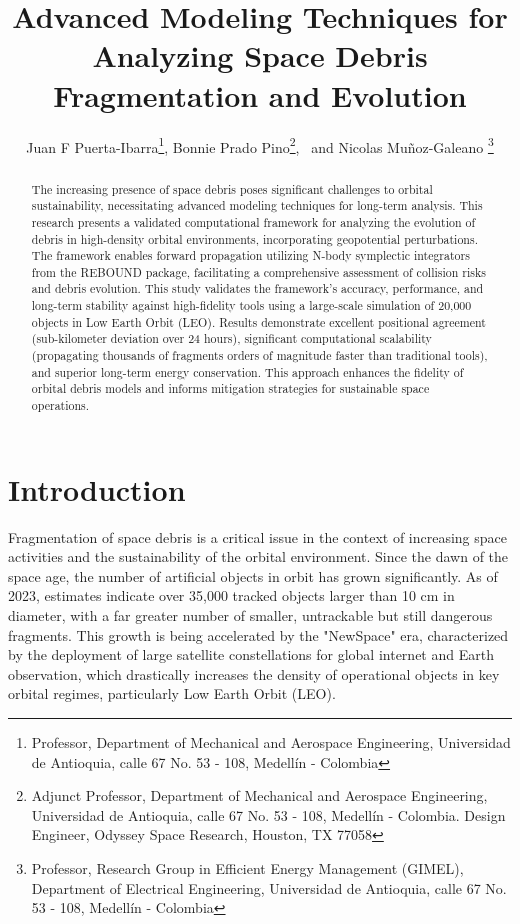 \documentclass[letterpaper, paper,11pt]{AAS}
\begin{document}
\title{Advanced Modeling Techniques for Analyzing Space Debris Fragmentation and Evolution}

\author{Juan F Puerta-Ibarra\thanks{Professor, Department of Mechanical and Aerospace Engineering, Universidad de Antioquia, calle 67 No. 53 - 108, Medellín - Colombia},  
Bonnie Prado Pino\thanks{Adjunct Professor, Department of Mechanical and Aerospace Engineering, Universidad de Antioquia, calle 67 No. 53 - 108, Medellín - Colombia. Design Engineer, Odyssey Space Research, Houston, TX 77058},
\ and Nicolas Muñoz-Galeano \thanks{Professor, Research Group in Efficient Energy Management (GIMEL), Department of Electrical Engineering, Universidad de Antioquia, calle 67 No. 53 - 108, Medellín - Colombia}
}

\maketitle

\begin{abstract}

The increasing presence of space debris poses significant challenges to orbital sustainability, necessitating advanced modeling techniques for long-term analysis. This research presents a validated computational framework for analyzing the evolution of debris in high-density orbital environments, incorporating geopotential perturbations. The framework enables forward propagation utilizing N-body symplectic integrators from the REBOUND package, facilitating a comprehensive assessment of collision risks and debris evolution. This study validates the framework's accuracy, performance, and long-term stability against high-fidelity tools using a large-scale simulation of 20,000 objects in Low Earth Orbit (LEO). Results demonstrate excellent positional agreement (sub-kilometer deviation over 24 hours), significant computational scalability (propagating thousands of fragments orders of magnitude faster than traditional tools), and superior long-term energy conservation. This approach enhances the fidelity of orbital debris models and informs mitigation strategies for sustainable space operations.
\end{abstract}

\section{Introduction}
Fragmentation of space debris is a critical issue in the context of increasing space activities and the sustainability of the orbital environment. Since the dawn of the space age, the number of artificial objects in orbit has grown significantly. As of 2023, estimates indicate over 35,000 tracked objects larger than 10 cm in diameter, with a far greater number of smaller, untrackable but still dangerous fragments\cite{european_space_agency_space_nodate}. This growth is being accelerated by the "NewSpace" era, characterized by the deployment of large satellite constellations for global internet and Earth observation, which drastically increases the density of operational objects in key orbital regimes, particularly Low Earth Orbit (LEO).
\end{document}
